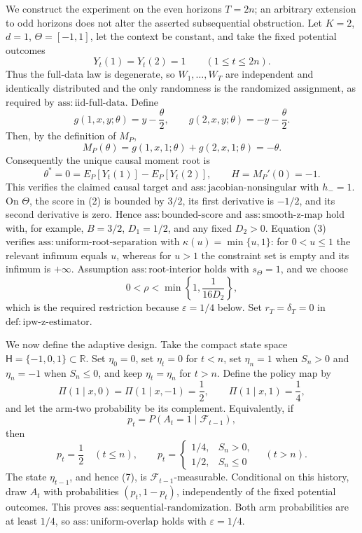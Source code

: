 We construct the experiment on the even horizons \(T=2n\); an arbitrary extension to odd horizons does not alter the asserted subsequential obstruction. Let \(K=2\), \(d=1\), \(\Theta=[-1,1]\), let the context be constant, and take the fixed potential outcomes
\[
Y_t(1)=Y_t(2)=1\qquad(1\le t\le 2n).
\tag{1}
\]
Thus the full-data law is degenerate, so \(W_1,\ldots,W_T\) are independent and identically distributed and the only randomness is the randomized assignment, as required by \(\mathrm{ass:iid\text{-}full\text{-}data}\). Define
\[
g(1,x,y;\theta)=y-\frac{\theta}{2},
\qquad
g(2,x,y;\theta)=-y-\frac{\theta}{2}.
\tag{2}
\]
Then, by the definition of \(M_P\),
\[
M_P(\theta)=g(1,x,1;\theta)+g(2,x,1;\theta)=-\theta.
\tag{3}
\]
Consequently the unique causal moment root is
\[
\theta^*=0=E_P[Y_t(1)]-E_P[Y_t(2)],
\qquad H=M_P'(0)=-1.
\tag{4}
\]
This verifies the claimed causal target and \(\mathrm{ass:jacobian\text{-}nonsingular}\) with \(h_-=1\). On \(\Theta\), the score in (2) is bounded by \(3/2\), its first derivative is \(-1/2\), and its second derivative is zero. Hence \(\mathrm{ass:bounded\text{-}score}\) and \(\mathrm{ass:smooth\text{-}z\text{-}map}\) hold with, for example, \(B=3/2\), \(D_1=1/2\), and any fixed \(D_2>0\). Equation (3) verifies \(\mathrm{ass:uniform\text{-}root\text{-}separation}\) with \(\kappa(u)=\min\{u,1\}\): for \(0<u\le1\) the relevant infimum equals \(u\), whereas for \(u>1\) the constraint set is empty and its infimum is \(+\infty\). Assumption \(\mathrm{ass:root\text{-}interior}\) holds with \(s_\Theta=1\), and we choose
\[
0<\rho<\min\left\{1,\frac{1}{16D_2}\right\},
\tag{5}
\]
which is the required restriction because \(\varepsilon=1/4\) below. Set \(r_T=\delta_T=0\) in \(\mathrm{def:ipw\text{-}z\text{-}estimator}\).

We now define the adaptive design. Take the compact state space \(\mathsf H=\{-1,0,1\}\subset\mathbb R\). Set \(\eta_0=0\), set \(\eta_t=0\) for \(t<n\), set \(\eta_n=1\) when \(S_n>0\) and \(\eta_n=-1\) when \(S_n\le0\), and keep \(\eta_t=\eta_n\) for \(t>n\). Define the policy map by
\[
\Pi(1\mid x,0)=\Pi(1\mid x,-1)=\frac12,
\qquad
\Pi(1\mid x,1)=\frac14,
\tag{6}
\]
and let the arm-two probability be its complement. Equivalently, if
\[
p_t=P(A_t=1\mid\mathcal F_{t-1}),
\]
then
\[
p_t=\frac12\quad(t\le n),
\qquad
p_t=
\begin{cases}
1/4,&S_n>0,\\
1/2,&S_n\le0
\end{cases}
\quad(t>n).
\tag{7}
\]
The state \(\eta_{t-1}\), and hence (7), is \(\mathcal F_{t-1}\)-measurable. Conditional on this history, draw \(A_t\) with probabilities \((p_t,1-p_t)\), independently of the fixed potential outcomes. This proves \(\mathrm{ass:sequential\text{-}randomization}\). Both arm probabilities are at least \(1/4\), so \(\mathrm{ass:uniform\text{-}overlap}\) holds with \(\varepsilon=1/4\).

